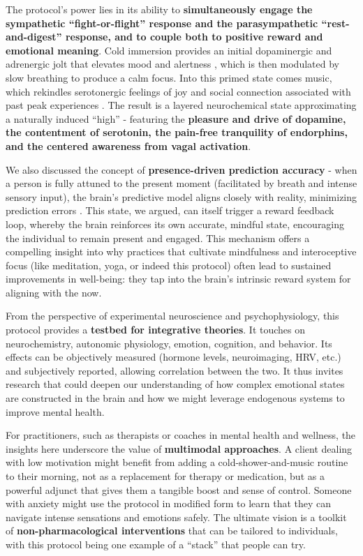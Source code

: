 \documentclass[11pt]{article}
\newcommand{\quotes}[1]{``#1''}
\begin{document}
The protocol's power lies in its ability to \textbf{simultaneously engage the sympathetic \quotes{fight-or-flight} response and the parasympathetic \quotes{rest-and-digest} response, and to couple both to positive reward and emotional meaning}. Cold immersion provides an initial dopaminergic and adrenergic jolt that elevates mood and alertness \cite{Sramek2000}, which is then modulated by slow breathing to produce a calm focus. Into this primed state comes music, which rekindles serotonergic feelings of joy and social connection associated with past peak experiences \cite{brainMuriel,jyiSeekingHappiness}. The result is a layered neurochemical state approximating a naturally induced \quotes{high} - featuring the \textbf{pleasure and drive of dopamine, the contentment of serotonin, the pain-free tranquility of endorphins, and the centered awareness from vagal activation}.

We also discussed the concept of \textbf{presence-driven prediction accuracy} - when a person is fully attuned to the present moment (facilitated by breath and intense sensory input), the brain's predictive model aligns closely with reality, minimizing prediction errors \cite{PretictiveMind}. This state, we argued, can itself trigger a reward feedback loop, whereby the brain reinforces its own accurate, mindful state, encouraging the individual to remain present and engaged. This mechanism offers a compelling insight into why practices that cultivate mindfulness and interoceptive focus (like meditation, yoga, or indeed this protocol) often lead to sustained improvements in well-being: they tap into the brain's intrinsic reward system for aligning with the now.

From the perspective of experimental neuroscience and psychophysiology, this protocol provides a \textbf{testbed for integrative theories}. It touches on neurochemistry, autonomic physiology, emotion, cognition, and behavior. Its effects can be objectively measured (hormone levels, neuroimaging, HRV, etc.) and subjectively reported, allowing correlation between the two. It thus invites research that could deepen our understanding of how complex emotional states are constructed in the brain and how we might leverage endogenous systems to improve mental health.

For practitioners, such as therapists or coaches in mental health and wellness, the insights here underscore the value of \textbf{multimodal approaches}. A client dealing with low motivation might benefit from adding a cold-shower-and-music routine to their morning, not as a replacement for therapy or medication, but as a powerful adjunct that gives them a tangible boost and sense of control. Someone with anxiety might use the protocol in modified form to learn that they can navigate intense sensations and emotions safely. The ultimate vision is a toolkit of \textbf{non-pharmacological interventions} that can be tailored to individuals, with this protocol being one example of a \quotes{stack} that people can try.
\end{document}

